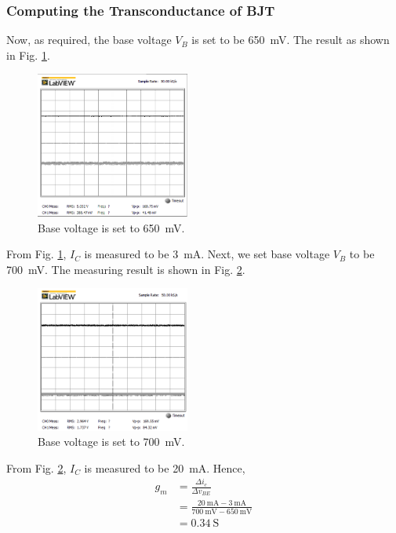 \documentclass[journal]{IEEEtran}
\begin{document}
\subsubsection{Computing the Transconductance of BJT}
\par Now, as required, the base voltage $V_{B}$ is set to be \SI{650}{\mV}. The result as
shown in Fig. \ref{fig-3-4}.
\begin{figure}[h]
  \centering
  \includegraphics[width=0.45\textwidth]{images/650mV.png}
  \caption{Base voltage is set to \SI{650}{\mV}.}
  \label{fig-3-4}
\end{figure}
\clearpage
\par From Fig. \ref{fig-3-4}, $I_{C}$ is measured to be  \SI{3}{\mA}. Next, we set base voltage $V_{B}$
to be \SI{700}{\mV}. The measuring result is shown in Fig. \ref{fig-3-5}.
\begin{figure}[h]
  \centering
  \includegraphics[width=0.45\textwidth]{images/700mV.png}
  \caption{Base voltage is set to \SI{700}{\mV}.}
  \label{fig-3-5}
\end{figure}
\par From Fig. \ref{fig-3-5}, $I_{C}$ is measured to be \SI{20}{\mA}. Hence,
\begin{equation*}
  \begin{split}
  g_{m}&=\frac{\Delta i_{c}}{\Delta v_{BE}}\\
  &=\frac{\SI{20}{\mA}-\SI{3}{\mA}}{\SI{700}{\mV}-\SI{650}{\mV}}\\
  &=\SI{0.34}{\siemens}
\end{split}
\end{equation*}
\end{document}
